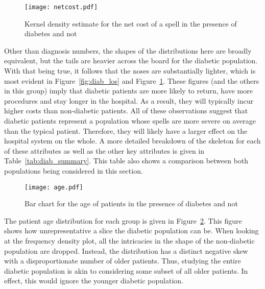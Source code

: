 \begin{figure}
    \centering
    \texttt{[image: netcost.pdf]}
    \caption{%
        Kernel density estimate for the net cost of a spell in the presence of
        diabetes and not
    }\label{fig:diab_netcost}
\end{figure}

Other than diagnosis numbers, the shapes of the distributions here are broadly
equivalent, but the tails are heavier across the board for the diabetic
population. With that being true, it follows that the noses are substantially
lighter, which is most evident in Figure~\ref{fig:diab_los} and
Figure~\ref{fig:diab_netcost}. These figures (and the others in this group)
imply that diabetic patients are more likely to return, have more procedures and
stay longer in the hospital. As a result, they will typically incur higher costs
than non-diabetic patients. All of these observations suggest that diabetic
patients represent a population whose spells are more severe on average than the
typical patient. Therefore, they will likely have a larger effect on the
hospital system on the whole. A more detailed breakdown of the skeleton for each
of these attributes as well as the other key attributes is given in
Table~\ref{tab:diab_summary}. This table also shows a comparison between both
populations being considered in this section.

\begin{sidewaystable}
    \centering
    \resizebox{.8\paperheight}{!}{%
        
    }
    \caption{%
        Spell-level statistics for each of the key attributes in the diabetic
        population (and non-diabetic population in parentheses)
    }\label{tab:diab_summary}
\end{sidewaystable}

\begin{figure}
    \centering
    \texttt{[image: age.pdf]}
    \caption{%
        Bar chart for the age of patients in the presence of diabetes and not
    }\label{fig:diab_age}
\end{figure}

The patient age distribution for each group is given in
Figure~\ref{fig:diab_age}. This figure shows how unrepresentative a slice the
diabetic population can be. When looking at the frequency density plot, all the
intricacies in the shape of the non-diabetic population are dropped. Instead,
the distribution has a distinct negative skew with a disproportionate number of
older patients. Thus, studying the entire diabetic population is akin to
considering some subset of all older patients. In effect, this would ignore the
younger diabetic population.

